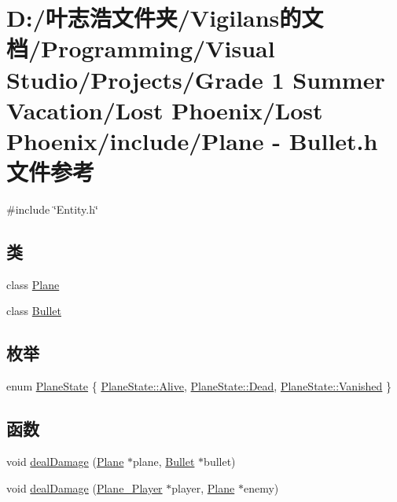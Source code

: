\hypertarget{_plane_01-_01_bullet_8h}{}\section{D\+:/叶志浩文件夹/\+Vigilans的文档/\+Programming/\+Visual Studio/\+Projects/\+Grade 1 Summer Vacation/\+Lost Phoenix/\+Lost Phoenix/include/\+Plane -\/ Bullet.\+h 文件参考}
\label{_plane_01-_01_bullet_8h}
{\ttfamily \#include \char`\"{}Entity.\+h\char`\"{}}\newline
\subsection*{类}
\begin{DoxyCompactItemize}
\item 
class \hyperlink{class_plane}{Plane}
\item 
class \hyperlink{class_bullet}{Bullet}
\end{DoxyCompactItemize}
\subsection*{枚举}
\begin{DoxyCompactItemize}
\item 
enum \hyperlink{_plane_01-_01_bullet_8h_a9f852e2715e13ec145d551659d2813bc}{Plane\+State} \{ \hyperlink{_plane_01-_01_bullet_8h_a9f852e2715e13ec145d551659d2813bcabd9f7c5d6ab4201b138a3e51dab7056f}{Plane\+State\+::\+Alive}, 
\hyperlink{_plane_01-_01_bullet_8h_a9f852e2715e13ec145d551659d2813bca183b62c7f067711f9c5a54913c054617}{Plane\+State\+::\+Dead}, 
\hyperlink{_plane_01-_01_bullet_8h_a9f852e2715e13ec145d551659d2813bcaece4f1ae7ea969a1a47e63cb8ac086ae}{Plane\+State\+::\+Vanished}
 \}
\end{DoxyCompactItemize}
\subsection*{函数}
\begin{DoxyCompactItemize}
\item 
void \hyperlink{_plane_01-_01_bullet_8h_a62df33be634d89b2428bc84d98761bb7}{deal\+Damage} (\hyperlink{class_plane}{Plane} $\ast$plane, \hyperlink{class_bullet}{Bullet} $\ast$bullet)
\item 
void \hyperlink{_plane_01-_01_bullet_8h_ab0e76936bbaa057d4f15ddf206b75b91}{deal\+Damage} (\hyperlink{class_plane___player}{Plane\+\_\+\+Player} $\ast$player, \hyperlink{class_plane}{Plane} $\ast$enemy)
\end{DoxyCompactItemize}


